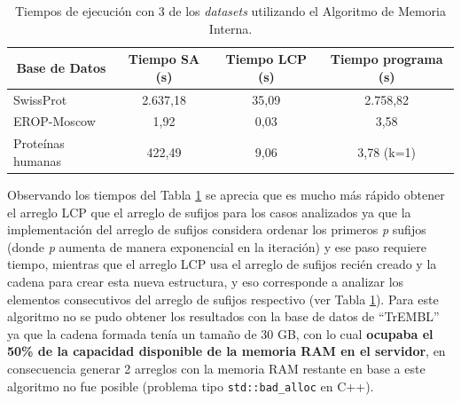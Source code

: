\begin{table}[h]
\centering
\begin{tabular}{|l|c|c|c|}
\hline
\multicolumn{1}{|c|}{\textbf{Base de Datos}}  & \textbf{Tiempo SA (s)} & \textbf{Tiempo LCP (s)} & \textbf{Tiempo programa (s)} \\ \hline
SwissProt         & 2.637,18                & 35,09                   & 2.758,82                         \\
EROP-Moscow       & 1,92                   & 0,03                    & 3,58                         \\
Proteínas humanas & 422,49                 & 9,06                    & 3,78 (k=1)                         \\ \hline
\end{tabular}
\caption{Tiempos de ejecución con 3 de los \textit{datasets} utilizando el Algoritmo de Memoria Interna.}
\label{tb:labelr3}
\end{table}

Observando los tiempos del Tabla \ref{tb:labelr3} se aprecia que es mucho más rápido obtener el arreglo LCP que el arreglo de sufijos para los casos analizados ya que la implementación del arreglo de sufijos considera ordenar los primeros \textit{p} sufijos (donde \textit{p} aumenta de manera exponencial en la iteración) y ese paso requiere tiempo, mientras que el arreglo LCP usa el arreglo de sufijos recién creado y la cadena para crear esta nueva estructura, y eso corresponde a analizar los elementos consecutivos del arreglo de sufijos respectivo (ver Tabla \ref{tb:labelr3}). Para este algoritmo no se pudo obtener los resultados con la base de datos de ``TrEMBL'' ya que la cadena formada tenía un tamaño de 30 GB, con lo cual \textbf{ocupaba el 50\% de la capacidad disponible de la memoria RAM en el servidor}, en consecuencia generar 2 arreglos con la memoria RAM restante en base a este algoritmo no fue posible (problema tipo \texttt{std::bad\_alloc} en C++). 

